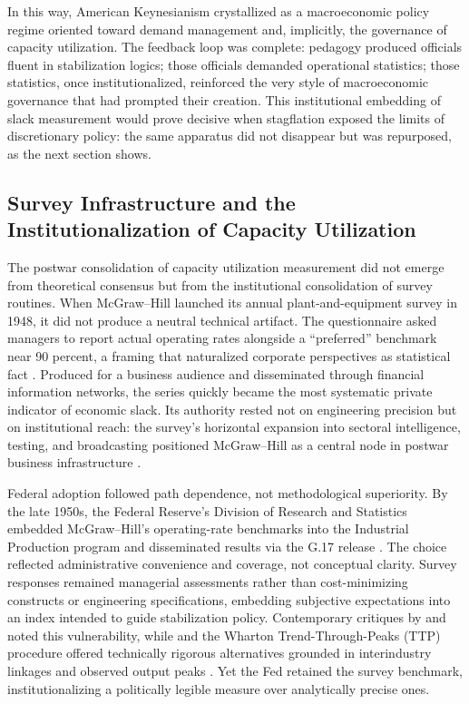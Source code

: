 \documentclass[11pt]{article}
\begin{document}
In this way, American Keynesianism crystallized as a macroeconomic policy regime oriented toward demand management and, implicitly, the governance of capacity utilization. The feedback loop was complete: pedagogy produced officials fluent in stabilization logics; those officials demanded operational statistics; those statistics, once institutionalized, reinforced the very style of macroeconomic governance that had prompted their creation. This institutional embedding of slack measurement would prove decisive when stagflation exposed the limits of discretionary policy: the same apparatus did not disappear but was repurposed, as the next section shows.

\subsection{Survey Infrastructure and the Institutionalization of Capacity Utilization}
\label{subsec:survey_infrastructure}

The postwar consolidation of capacity utilization measurement did not emerge from theoretical consensus but from the institutional consolidation of survey routines. When McGraw--Hill launched its annual plant-and-equipment survey in 1948, it did not produce a neutral technical artifact. The questionnaire asked managers to report actual operating rates alongside a ``preferred'' benchmark near 90 percent, a framing that naturalized corporate perspectives as statistical fact \citep{butler1958,phillips1963}. Produced for a business audience and disseminated through financial information networks, the series quickly became the most systematic private indicator of economic slack. Its authority rested not on engineering precision but on institutional reach: the survey's horizontal expansion into sectoral intelligence, testing, and broadcasting positioned McGraw--Hill as a central node in postwar business infrastructure \citep{munroe2007,baransweezy1988}.

Federal adoption followed path dependence, not methodological superiority. By the late 1950s, the Federal Reserve's Division of Research and Statistics embedded McGraw--Hill's operating-rate benchmarks into the Industrial Production program and disseminated results via the G.17 release \citep{bogfrs2017}. The choice reflected administrative convenience and coverage, not conceptual clarity. Survey responses remained managerial assessments rather than cost-minimizing constructs or engineering specifications, embedding subjective expectations into an index intended to guide stabilization policy. Contemporary critiques by \citet{butler1958} and \citet{phillips1963} noted this vulnerability, while \citet{kleindavid1958} and the Wharton Trend-Through-Peaks (TTP) procedure offered technically rigorous alternatives grounded in interindustry linkages and observed output peaks \citep{kleinsummers1967}. Yet the Fed retained the survey benchmark, institutionalizing a politically legible measure over analytically precise ones.
\end{document}
